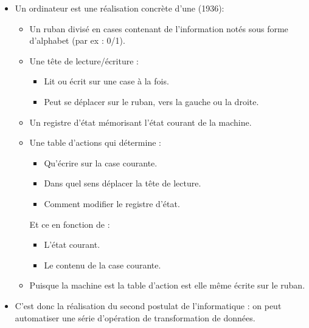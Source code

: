 \documentclass{beamer}
\begin{document}
\begin{frame}
	\begin{itemize}
		\item Un ordinateur est une réalisation concrète d'une  (1936):
			\begin{itemize}
				\item Un ruban divisé en cases contenant de l'information notés sous forme d'alphabet (par ex : 0/1).
				\item Une tête de lecture/écriture :
					\begin{itemize}
						\item Lit ou écrit sur une case à la fois.
						\item Peut se déplacer sur le ruban, vers la gauche ou la droite.
					\end{itemize}
				\item Un registre d'état mémorisant l'état courant de la machine.
				\item Une table d'actions qui détermine :
					\begin{itemize}
						\item Qu'écrire sur la case courante.
						\item Dans quel sens déplacer la tête de lecture.
						\item Comment modifier le registre d'état.
					\end{itemize}
					Et ce en fonction de :
					\begin{itemize}
						\item L'état courant.
						\item Le contenu de la case courante.
					\end{itemize}
				\item Puisque la machine est  la table d'action est elle même écrite sur le ruban.
			\end{itemize}
	
		\item C'est donc la réalisation du second postulat de l'informatique : on peut automatiser une série d'opération de transformation de données.
	\end{itemize}
\end{frame}
\end{document}
